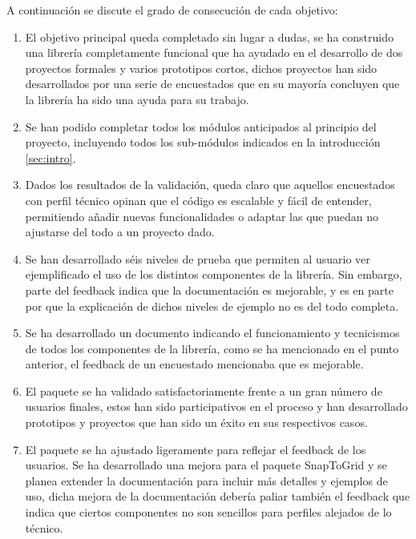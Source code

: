 A continuación se discute el grado de consecución de cada objetivo:
\begin{enumerate}[itemsep=0mm]

\item El objetivo principal queda completado sin lugar a dudas, se ha construido una librería completamente funcional que ha ayudado en el desarrollo de dos proyectos formales y varios prototipos cortos, dichos 
proyectos han sido desarrollados por una serie de encuestados que en su mayoría concluyen que la librería ha sido una ayuda para su trabajo.
  
\item Se han podido completar todos los módulos anticipados al principio del proyecto, incluyendo todos los sub-módulos indicados en la introducción \ref{sec:intro}.

\item Dados los resultados de la validación, queda claro que aquellos encuestados con perfil técnico opinan que el código es escalable y fácil de entender, permitiendo añadir nuevas funcionalidades o adaptar 
las que puedan no ajustarse del todo a un proyecto dado.

\item Se han desarrollado séis niveles de prueba que permiten al usuario ver ejemplificado el uso de los distintos componentes de la librería. Sin embargo, parte del feedback indica que la documentación es 
mejorable, y es en parte por que la explicación de dichos niveles de ejemplo no es del todo completa.

\item Se ha desarrollado un documento indicando el funcionamiento y tecnicismos de todos los componentes de la librería, como se ha mencionado en el punto anterior, el feedback de un encuestado mencionaba que
 es mejorable.
 
\item El paquete se ha validado satisfactoriamente frente a un gran número de usuarios finales, estos han sido participativos en el proceso y han desarrollado prototipos y proyectos que han sido un éxito en 
sus respectivos casos.

\item El paquete se ha ajustado ligeramente para reflejar el feedback de los usuarios. Se ha desarrollado una mejora para el paquete SnapToGrid y se planea extender la documentación para incluir más detalles 
y ejemplos de uso, dicha mejora de la documentación debería paliar también el feedback que indica que ciertos componentes no son sencillos para perfiles alejados de lo técnico.

\end{enumerate}

